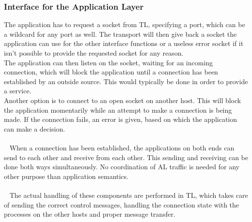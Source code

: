 \subsubsection{Interface for the Application Layer}
The application has to request a socket from TL, specifying a port, which can be a wildcard for any port as well. The transport will then give back a socket the application can use for the other interface functions or a useless error socket if it isn't possible to provide the requested socket for any reason.\\
The application can then listen on the socket, waiting for an incoming connection, which will block the application until a connection has been established by an outside source. This would typically be done in order to provide a service.\\
Another option is to connect to an open socket on another host. This will block the application momentarily while an attempt to make a connection is being made. If the connection fails, an error is given, based on which the application can make a decision.\\
\\~
When a connection has been established, the applications on both ends can send to each other and receive from each other. This sending and receiving can be done both ways simultaneously. No coordination of AL traffic is needed for any other purpose than application semantics.\\
\\~
The actual handling of these components are performed in TL, which takes care of sending the correct control messages, handling the connection state with the processes on the other hosts and proper message transfer.









